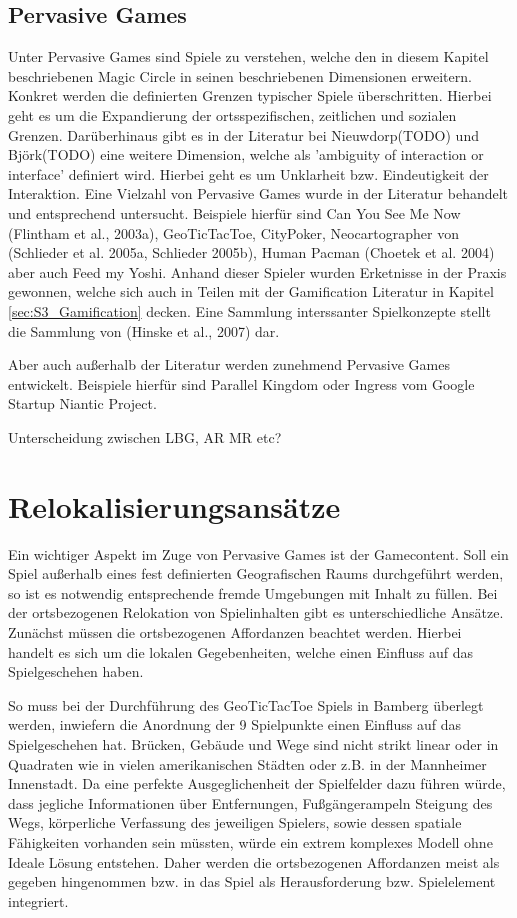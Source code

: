 \subsection*{Pervasive Games}

Unter Pervasive Games sind Spiele zu verstehen, welche den in diesem Kapitel beschriebenen Magic Circle in seinen beschriebenen Dimensionen erweitern.
Konkret werden die definierten Grenzen typischer Spiele überschritten. \cite{Montola.2005}
Hierbei geht es um die Expandierung der ortsspezifischen, zeitlichen und sozialen Grenzen. \cite{Montola.2009}
Darüberhinaus gibt es in der Literatur bei Nieuwdorp(TODO) und Björk(TODO) eine weitere Dimension, welche als 'ambiguity 
of  interaction or  interface' definiert wird. Hierbei geht es um Unklarheit bzw. Eindeutigkeit der Interaktion.
Eine Vielzahl von Pervasive Games wurde in der Literatur behandelt und entsprechend untersucht.
Beispiele hierfür sind Can You See Me Now (Flintham et al., 2003a), GeoTicTacToe, CityPoker, Neocartographer von (Schlieder et al. 2005a, Schlieder 2005b), Human Pacman (Choetek et al. 2004) aber auch Feed my Yoshi.
Anhand dieser Spieler wurden Erketnisse in der Praxis gewonnen, welche sich auch in Teilen mit der Gamification Literatur in Kapitel \ref{sec:S3_Gamification} decken.
Eine Sammlung interssanter Spielkonzepte stellt die Sammlung von (Hinske et al., 2007) dar.

Aber auch außerhalb der Literatur werden zunehmend Pervasive Games entwickelt.
Beispiele hierfür sind Parallel Kingdom oder Ingress vom Google Startup Niantic Project.

Unterscheidung zwischen LBG, AR MR etc?

\section{Relokalisierungsansätze}
\label{ch3:s:Relokalisierung}

Ein wichtiger Aspekt im Zuge von Pervasive Games ist der Gamecontent. Soll ein Spiel außerhalb eines fest definierten Geografischen Raums durchgeführt werden, so ist es notwendig entsprechende fremde Umgebungen mit Inhalt zu füllen. \cite{Montola.2005} 
Bei der ortsbezogenen Relokation von Spielinhalten gibt es unterschiedliche Ansätze.
Zunächst müssen die ortsbezogenen Affordanzen beachtet werden. Hierbei handelt es sich um die lokalen Gegebenheiten, welche einen Einfluss auf das Spielgeschehen haben.

So muss bei der Durchführung des GeoTicTacToe Spiels in Bamberg überlegt werden, inwiefern die Anordnung der 9 Spielpunkte einen Einfluss auf das Spielgeschehen hat. Brücken, Gebäude und Wege sind nicht strikt linear oder in Quadraten wie in vielen amerikanischen Städten oder z.B. in der Mannheimer Innenstadt. Da eine perfekte Ausgeglichenheit der Spielfelder dazu führen würde, dass jegliche Informationen über Entfernungen, Fußgängerampeln Steigung des Wegs, körperliche Verfassung des jeweiligen Spielers, sowie dessen spatiale Fähigkeiten vorhanden sein müssten, würde ein extrem komplexes Modell ohne Ideale Lösung entstehen. Daher werden die ortsbezogenen Affordanzen meist als gegeben hingenommen bzw. in das Spiel als Herausforderung bzw. Spielelement integriert.

